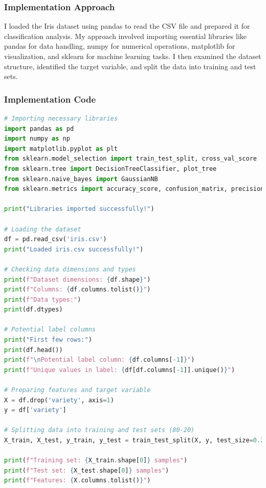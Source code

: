 \documentclass[12pt,a4paper]{article}
\begin{document}
\subsubsection{Implementation Approach}
I loaded the Iris dataset using pandas to read the CSV file and prepared it for classification analysis. My approach involved importing essential libraries like pandas for data handling, numpy for numerical operations, matplotlib for visualization, and sklearn for machine learning tasks. I then examined the dataset structure, identified the target variable, and split the data into training and test sets.

\subsubsection{Implementation Code}
\begin{lstlisting}[language=Python, caption=Dataset Loading and Data Preparation]
# Importing necessary libraries
import pandas as pd
import numpy as np
import matplotlib.pyplot as plt
from sklearn.model_selection import train_test_split, cross_val_score
from sklearn.tree import DecisionTreeClassifier, plot_tree
from sklearn.naive_bayes import GaussianNB
from sklearn.metrics import accuracy_score, confusion_matrix, precision_score, recall_score

print("Libraries imported successfully!")

# Loading the dataset
df = pd.read_csv('iris.csv')
print("Loaded iris.csv successfully!")

# Checking data dimensions and types
print(f"Dataset dimensions: {df.shape}")
print(f"Columns: {df.columns.tolist()}")
print(f"Data types:")
print(df.dtypes)

# Potential label columns
print("First few rows:")
print(df.head())
print(f"\nPotential label column: {df.columns[-1]}")
print(f"Unique values in label: {df[df.columns[-1]].unique()}")

# Preparing features and target variable
X = df.drop('variety', axis=1)
y = df['variety']

# Splitting data into training and test sets (80-20)
X_train, X_test, y_train, y_test = train_test_split(X, y, test_size=0.2, random_state=42, stratify=y)

print(f"Training set: {X_train.shape[0]} samples")
print(f"Test set: {X_test.shape[0]} samples")
print(f"Features: {X.columns.tolist()}")
\end{lstlisting}
\end{document}
